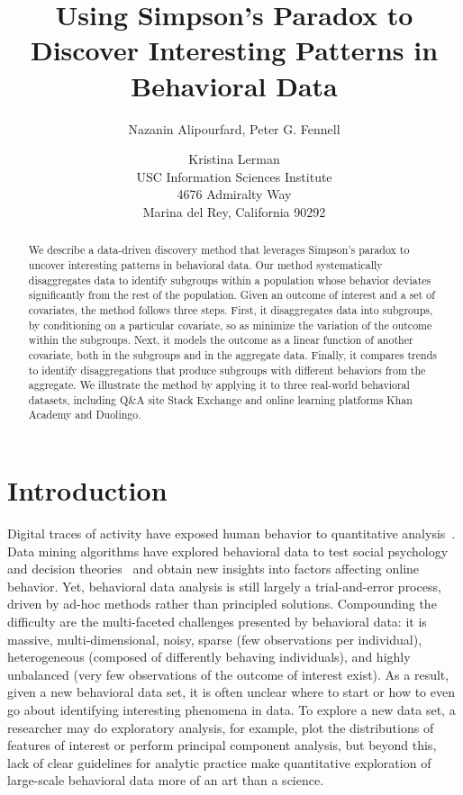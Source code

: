 \documentclass[letterpaper]{article} %
\title{Using Simpson's Paradox to Discover Interesting Patterns in Behavioral Data}
\author{Nazanin Alipourfard, Peter G. Fennell	 \and Kristina Lerman\\
USC Information Sciences Institute\\
4676 Admiralty Way\\
Marina del Rey, California 90292\\
}
\begin{document}
\maketitle



\graphicspath{ {figures/} }

\maketitle
\begin{abstract}
We describe a data-driven discovery method that leverages Simpson's paradox to uncover interesting patterns in behavioral data. Our method systematically disaggregates data to identify subgroups within a population whose behavior deviates significantly from the rest of the population. Given an outcome of interest and a set of covariates, the method follows three steps. First, it disaggregates data into subgroups, by conditioning on a particular covariate, so as minimize the variation of the outcome within the subgroups. Next, it models the outcome as a linear function of another covariate, both in the subgroups and in the aggregate data. Finally, it compares trends
to identify disaggregations that produce subgroups with different behaviors from the aggregate.
We illustrate the method by applying it to three real-world behavioral datasets, including Q\&A site Stack Exchange and online learning platforms Khan Academy and Duolingo.
\end{abstract}

\section{Introduction}
Digital traces of activity have exposed human behavior to quantitative analysis~\cite{Lazer09,mcfarland2016sociology}. Data mining algorithms have explored behavioral data to test social psychology and decision theories~\cite{kleinberg2017human,bond201261} and obtain new insights into factors affecting online behavior.
Yet, behavioral data analysis is still largely a trial-and-error process, driven by ad-hoc methods rather than principled solutions. Compounding the difficulty are the multi-faceted challenges presented by behavioral data: it is massive, multi-dimensional, noisy, sparse (few observations per individual), heterogeneous (composed of differently behaving individuals), and highly unbalanced (very few observations of the outcome of interest exist). As a result, given a new behavioral data set, it is often unclear where to start or how to even go about identifying interesting phenomena in data. To explore a new data set, a researcher may do exploratory analysis, for example,  plot the distributions of features of interest or perform principal component analysis, but beyond this, lack of clear guidelines for analytic practice make quantitative exploration of large-scale behavioral data more of an art than a science.
\end{document}
